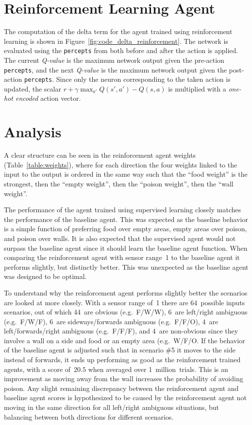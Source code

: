 \documentclass[paper=a4, fontsize=10pt]{scrartcl}
\begin{document}
\begin{multicols}{2}
\section*{Reinforcement Learning Agent}

The computation of the delta term for the agent trained using reinforcement learning is shown in Figure~\ref{fig:code_delta_reinforcement}. The network is evaluated using the \texttt{percepts} from both before and after the action is applied. The current \textit{Q-value} is the maximum network output given the pre-action \texttt{percepts}, and the next \textit{Q-value} is the maximum network output given the post-action \texttt{percepts}. Since only the neuron corresponding to the taken action is updated, the scalar ${r + \gamma \max_{a'} Q(s', a') - Q(s, a)}$ is multiplied with a \textit{one-hot encoded} action vector.

\vspace{-0.3cm}
\section*{Analysis}

A clear structure can be seen in the reinforcement agent weights (Table~\ref{table:weights}), where for each direction the four weights linked to the input to the output is ordered in the same way such that the ``food weight'' is the strongest, then the ``empty weight'', then the ``poison weight'', then the ``wall weight''.

The performance of the agent trained using supervised learning closely matches the performance of the baseline agent. This was expected as the baseline behavior is a simple function of preferring food over empty areas, empty areas over poison, and poison over walls. It is also expected that the supervised agent would not surpass the baseline agent since it should learn the baseline agent function. When comparing the reinforcement agent with sensor range~1 to the baseline agent it performs slightly, but distinctly better. This was unexpected as the baseline agent was designed to be optimal.

To understand why the reinforcement agent performs slightly better the scenarios are looked at more closely. With a sensor range of~1 there are 64~possible inputs scenarios, out of which 44~are obvious (e.g.~\textsc{F/W/W}), 6~are left/right ambiguous (e.g.~\textsc{F/W/F}), 6~are sideways/forwards ambiguous (e.g.~\textsc{F/F/O}), 4~are left/forwards/right ambiguous (e.g.~\textsc{F/F/F}), and 4~are non-obvious since they involve a wall on a side and food or an empty area (e.g.~\textsc{W/F/O}. If the behavior of the baseline agent is adjusted such that in scenario \#5 it moves to the side instead of forwards, it ends up performing as good as the reinforcement trained agents, with a score of~$20.5$ when averaged over 1~million~trials. This is an improvement as moving away from the wall increases the probability of avoiding poison. Any slight remaining discrepancy between the reinforcement agent and baseline agent scores is hypothesized to be caused by the reinforcement agent not moving in the same direction for all left/right ambiguous situations, but balancing between both directions for different scenarios.


\end{multicols}
\end{document}
